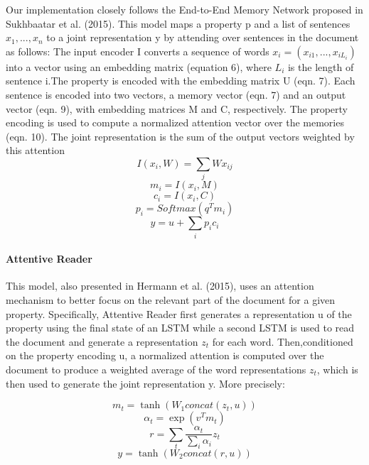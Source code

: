 \documentclass{article}
\begin{document}
Our implementation closely follows  the  End-to-End  Memory Network  proposed  in  Sukhbaatar  et  al.  (2015). This  model maps   a   property p
and a list of sentences $x_1 ,...,x_n$ to a joint representation y by attending  over  sentences  in  the  document  as  follows:
The input encoder I converts a sequence of words
$x_i= (x_{i1},...,x_{iL_i})$ into a vector using an embedding matrix (equation 6), where $L_i$ is the length of sentence i.The property is encoded with the embedding matrix U (eqn. 7). Each sentence is encoded into two vectors, a memory vector (eqn. 7) and an output vector (eqn. 9), with embedding matrices M and C, respectively. The property encoding is used to compute a normalized attention vector over the memories (eqn. 10). The joint representation is the sum of the output vectors weighted by this attention
\begin{equation}
I(x_i,W) = \sum_j W x_{ij}
\end{equation}
\begin{equation}
m_i = I(x_i,M)
\end{equation}
\begin{equation}
c_i = I(x_i,C)
\end{equation}
\begin{equation}
p_i = Softmax(q^T m_i)
\end{equation}
\begin{equation}
y = u + \sum_i p_ic_i
\end{equation}

\paragraph{Attentive Reader}

This  model,  also  presented in Hermann et al. (2015), uses an attention mechanism  to  better  focus  on  the  relevant  part  of  the document for a given property.   Specifically,  Attentive Reader first generates a representation u of the property using the final state of an LSTM while a second LSTM is used to read the document and generate a representation $z_t$
for each word.  Then,conditioned on the property encoding u, a normalized attention is computed over the document to produce a weighted average of the word representations $z_t$, which is then used to generate the joint representation y. More precisely:

\begin{equation}
m_t = \tanh(W_1 concat(z_t,u))
\end{equation}
\begin{equation}
\alpha_t = \exp(v^T m_t)
\end{equation}
\begin{equation}
r = \sum_t \frac{\alpha_t}{\sum_i \alpha_i} z_t
\end{equation}
\begin{equation}
y = \tanh(W_2 concat(r,u))
\end{equation}
\end{document}
